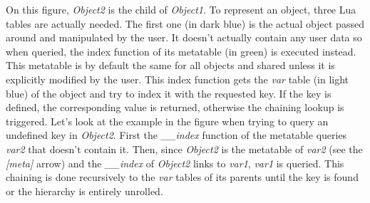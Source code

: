 On this figure, \emph{Object2} is the child of \emph{Object1}. To represent an
object, three Lua tables are actually needed. The first one (in dark blue) is
the actual object passed around and manipulated by the user. It doesn't actually
contain any user data so when queried, the index function of its metatable (in
green) is executed instead. This metatable is by default the same for all objects
and shared unless it is explicitly modified by the user. This index function gets the
\emph{var} table (in light blue) of the object and try to index it with the
requested key. If the key is defined, the corresponding value is returned,
otherwise the chaining lookup is triggered. Let's look at the example in the
figure when trying to query an undefined key in \emph{Object2}.
First the \emph{\_\_index} function of the metatable queries \emph{var2} that doesn't contain it. Then, since
\emph{Object2} is the metatable of \emph{var2} (see the \emph{[meta]} arrow) and
the \emph{\_\_index} of \emph{Object2} links to \emph{var1}, \emph{var1} is queried.
This chaining is done recursively to the \emph{var} tables of its parents until the
key is found or the hierarchy is entirely unrolled.
